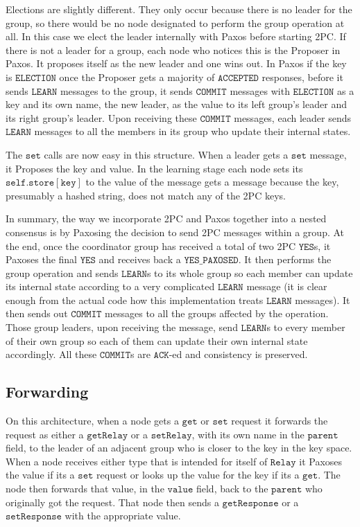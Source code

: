 \documentclass{amsart}
\theoremstyle{definition}
\theoremstyle{remark}
\numberwithin{equation}{section}
\begin{document}
Elections are slightly different. They only occur because there is no leader for the group, so there would be no node designated to perform the group operation at all. In this case we elect the leader internally with Paxos before starting 2PC. If there is not a leader for a group, each node who notices this is the Proposer in Paxos. It proposes itself as the new leader and one wins out. In Paxos if the key is $\mathtt{ELECTION}$ once the Proposer gets a majority of $\mathtt{ACCEPTED}$ responses, before it sends $\mathtt{LEARN}$ messages to the group, it sends $\mathtt{COMMIT}$ messages with $\mathtt{ELECTION}$ as a key and its own name, the new leader, as the value to its left group's leader and its right group's leader. Upon receiving these $\mathtt{COMMIT}$ messages, each leader sends $\mathtt{LEARN}$ messages to all the members in its group who update their internal states.

The $\mathtt{set}$ calls are now easy in this structure. When a leader gets a $\mathtt{set}$ message, it Proposes the key and value. In the learning stage each node sets its $\mathtt{self.store[key]}$ to the value of the message gets a message because the key, presumably a hashed string, does not match any of the 2PC keys.

In summary, the way we incorporate 2PC and Paxos together into a nested consensus is by Paxosing the decision to send 2PC messages within a group. At the end, once the coordinator group has received a total of two 2PC $\mathtt{YES}$s, it Paxoses the final $\mathtt{YES}$ and receives back a $\mathtt{YES\_PAXOSED}$. It then performs the group operation and sends $\mathtt{LEARN}$s to its whole group so each member can update its internal state according to a very complicated $\mathtt{LEARN}$ message (it is clear enough from the actual code how this implementation treats $\mathtt{LEARN}$ messages). It then sends out $\mathtt{COMMIT}$ messages to all the groups affected by the operation. Those group leaders, upon receiving the message, send $\mathtt{LEARN}$s to every member of their own group so each of them can update their own internal state accordingly. All these $\mathtt{COMMIT}$s are $\mathtt{ACK}$-ed and consistency is preserved.
\subsection{Forwarding}
On this architecture, when a node gets a $\mathtt{get}$ or $\mathtt{set}$ request it forwards the request as either a $\mathtt{getRelay}$ or a $\mathtt{setRelay}$, with its own name in the $\mathtt{parent}$ field, to the leader of an adjacent group who is closer to the key in the key space. When a node receives either type that is intended for itself of $\mathtt{Relay}$ it Paxoses the value if its a $\mathtt{set}$ request or looks up the value for the key if its a $\mathtt{get}$. The node then forwards that value, in the $\mathtt{value}$ field, back to the $\mathtt{parent}$ who originally got the request. That node then sends a $\mathtt{getResponse}$ or a $\mathtt{setResponse}$ with the appropriate value.
\end{document}
